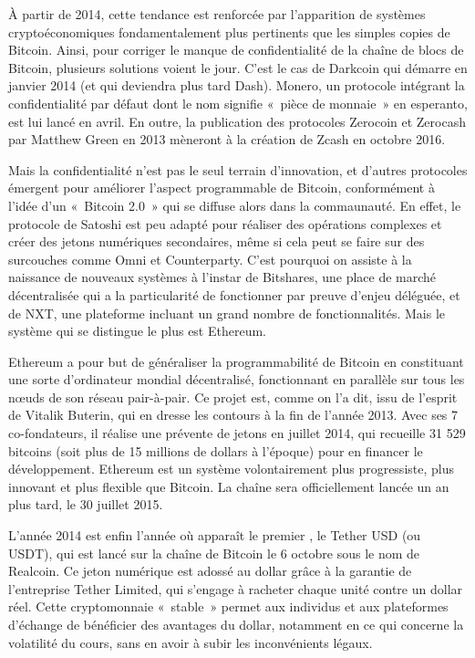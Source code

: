 À partir de 2014, cette tendance est renforcée par l'apparition de systèmes cryptoéconomiques fondamentalement plus pertinents que les simples copies de Bitcoin. Ainsi, pour corriger le manque de confidentialité de la chaîne de blocs de Bitcoin, plusieurs solutions voient le jour. C'est le cas de Darkcoin qui démarre en janvier 2014 (et qui deviendra plus tard Dash). Monero, un protocole intégrant la confidentialité par défaut dont le nom signifie «~pièce de monnaie~» en esperanto, est lui lancé en avril. En outre, la publication des protocoles Zerocoin et Zerocash par Matthew Green en 2013 mèneront à la création de Zcash en octobre 2016.

Mais la confidentialité n'est pas le seul terrain d'innovation, et d'autres protocoles émergent pour améliorer l'aspect programmable de Bitcoin, conformément à l'idée d'un «~Bitcoin 2.0~» qui se diffuse alors dans la commaunauté. En effet, le protocole de Satoshi est peu adapté pour réaliser des opérations complexes et créer des jetons numériques secondaires, même si cela peut se faire sur des surcouches comme Omni et Counterparty. C'est pourquoi on assiste à la naissance  de nouveaux systèmes à l'instar de Bitshares, une place de marché décentralisée qui a la particularité de fonctionner par preuve d'enjeu déléguée, et de NXT, une plateforme incluant un grand nombre de fonctionnalités. Mais le système qui se distingue le plus est Ethereum.

Ethereum a pour but de généraliser la programmabilité de Bitcoin en constituant une sorte d'ordinateur mondial décentralisé, fonctionnant en parallèle sur tous les nœuds de son réseau pair-à-pair. Ce projet est, comme on l'a dit, issu de l'esprit de Vitalik Buterin, qui en dresse les contours à la fin de l'année 2013. Avec ses 7 co-fondateurs, il réalise une prévente de jetons en juillet 2014, qui recueille 31 529 bitcoins (soit plus de 15 millions de dollars à l'époque) pour en financer le développement. Ethereum est un système volontairement plus progressiste, plus innovant et plus flexible que Bitcoin. La chaîne sera officiellement lancée un an plus tard, le 30 juillet 2015.

L'année 2014 est enfin l'année où apparaît le premier , le Tether USD (ou USDT), qui est lancé sur la chaîne de Bitcoin le 6 octobre sous le nom de Realcoin. Ce jeton numérique est adossé au dollar grâce à la garantie de l'entreprise Tether Limited, qui s'engage à racheter chaque unité contre un dollar réel. Cette cryptomonnaie «~stable~» permet aux individus et aux plateformes d'échange de bénéficier des avantages du dollar, notamment en ce qui concerne la volatilité du cours, sans en avoir à subir les inconvénients légaux.

